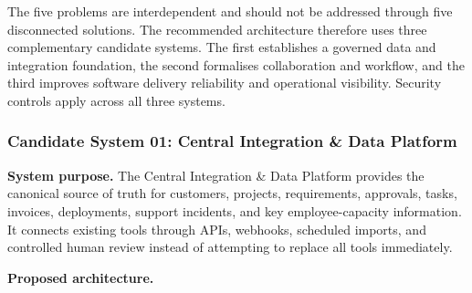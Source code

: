 \documentclass[12pt,a4paper]{report}
\begin{document}
The five problems are interdependent and should not be addressed through five disconnected
solutions. The recommended architecture therefore uses three complementary candidate systems.
The first establishes a governed data and integration foundation, the second formalises
collaboration and workflow, and the third improves software delivery reliability and operational
visibility. Security controls apply across all three systems.

\subsubsection{Candidate System 01: Central Integration \& Data Platform}\label{sec:candidate-central}

\textbf{System purpose.}
The Central Integration \& Data Platform provides the canonical source of truth for customers,
projects, requirements, approvals, tasks, invoices, deployments, support incidents, and key
employee-capacity information. It connects existing tools through APIs, webhooks, scheduled
imports, and controlled human review instead of attempting to replace all tools immediately.

\textbf{Proposed architecture.}
\end{document}
